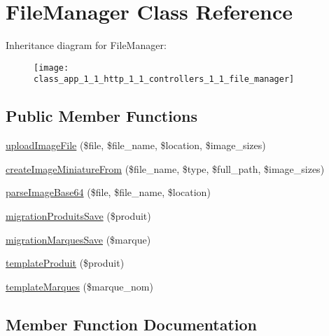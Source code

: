 \hypertarget{class_app_1_1_http_1_1_controllers_1_1_file_manager}{}\section{File\+Manager Class Reference}
\label{class_app_1_1_http_1_1_controllers_1_1_file_manager}
Inheritance diagram for File\+Manager\+:\begin{figure}[H]
\begin{center}
\leavevmode
\texttt{[image: class\_app\_1\_1\_http\_1\_1\_controllers\_1\_1\_file\_manager]}
\end{center}
\end{figure}
\subsection*{Public Member Functions}
\begin{DoxyCompactItemize}
\item 
\mbox{\hyperlink{class_app_1_1_http_1_1_controllers_1_1_file_manager_abe6821967ac917d22565a423c0c64e4d}{upload\+Image\+File}} (\$file, \$file\+\_\+name, \$location, \$image\+\_\+sizes)
\item 
\mbox{\hyperlink{class_app_1_1_http_1_1_controllers_1_1_file_manager_a57d9b01a568dfb298eb0bb9f7dbde601}{create\+Image\+Miniature\+From}} (\$file\+\_\+name, \$type, \$full\+\_\+path, \$image\+\_\+sizes)
\item 
\mbox{\hyperlink{class_app_1_1_http_1_1_controllers_1_1_file_manager_a0c2a5d2726a4e293b9f8d7a4b3d77bbf}{parse\+Image\+Base64}} (\$file, \$file\+\_\+name, \$location)
\item 
\mbox{\hyperlink{class_app_1_1_http_1_1_controllers_1_1_file_manager_a19af8b2cd6852d7d707ac948a1507190}{migration\+Produits\+Save}} (\$produit)
\item 
\mbox{\hyperlink{class_app_1_1_http_1_1_controllers_1_1_file_manager_ad94bbbc7983eb9968d476f0bda016398}{migration\+Marques\+Save}} (\$marque)
\item 
\mbox{\hyperlink{class_app_1_1_http_1_1_controllers_1_1_file_manager_a1fcf2dca5b3aea886390c0b8e98ed215}{template\+Produit}} (\$produit)
\item 
\mbox{\hyperlink{class_app_1_1_http_1_1_controllers_1_1_file_manager_a3bfe12ca7cfd6540984b98cec3b7b058}{template\+Marques}} (\$marque\+\_\+nom)
\end{DoxyCompactItemize}


\subsection{Member Function Documentation}
\mbox{\label{class_app_1_1_http_1_1_controllers_1_1_file_manager_a57d9b01a568dfb298eb0bb9f7dbde601}} 

